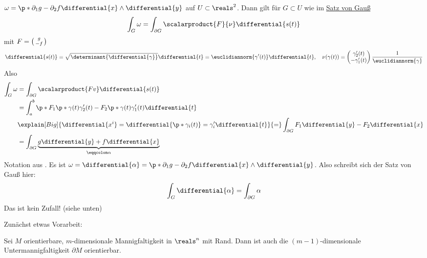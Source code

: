 \begin{beispiel}
  \( \omega=\p*{ \partial_1g-\partial_2f }\differential{x}\wedge\differential{y} \) auf \( U\subset \reals^2 \).
  Dann gilt für \( G\subset U \) wie im \hyperref[integralsatz_gauss]{Satz von Gauß} 
  \begin{equation*}
      \int_G\omega=\int_{\partial G}\scalarproduct{F}{\nu}\differential{s(t)}
  \end{equation*}
  mit \( F=\begin{psmallmatrix} g\\-f \end{psmallmatrix} \)
  \begin{equation*}
      \differential{s(t)}=\sqrt{\determinant{\differential{\gamma}}}\differential{t}=\euclidiannorm{\gamma'(t)}\differential{t},\quad \nu(\gamma(t))=\begin{pmatrix} \gamma_2'(t)\\-\gamma_1'(t) \end{pmatrix} \frac{1}{\euclidiannorm{\gamma}} 
  \end{equation*}
  Also 
  \begin{align*}
      \int_{G}\omega &= \int_{\partial G}\scalarproduct{Fv}\differential{s(t)}\\
      &= \int_{a}^{b}\p*{ F_1\p*{\gamma(t)}\gamma_2'(t)-F_2\p*{\gamma(t)}\gamma_1'(t) }\differential{t}\\
      &\explain[Big]{ \differential{x^i}=\differential{\p*{ \gamma_i(t) }}=\gamma_i'\differential{t}}{=}
      \int_{\partial G}F_1\differential{y}-F_2\differential{x}\\
      &= \int_{\partial G}\underbrace{g\differential{y}+f\differential{x}}_{\eqqcolon \alpha}
  \end{align*}
  Notation aus .
  Es ist \( \omega=\differential{\alpha}=\p*{ \partial_1g-\partial_2f }\differential{x}\wedge\differential{y} \).
  Also schreibt sich der Satz von Gauß hier:
  \begin{equation*}
      \int_{G}\differential{\alpha}=\int_{\partial G}\alpha
  \end{equation*}
  Das ist kein Zufall! (siehe unten)
\end{beispiel}

Zunächst etwas Vorarbeit:

\begin{satz}
  Sei \( M \) orientierbare, \( m \)-dimensionale Mannigfaltigkeit in \( \reals^n \) mit Rand.
  Dann ist auch die \( (m-1) \)-dimensionale Untermannigfaltigkeit \( \partial M \) orientierbar.
\end{satz}

